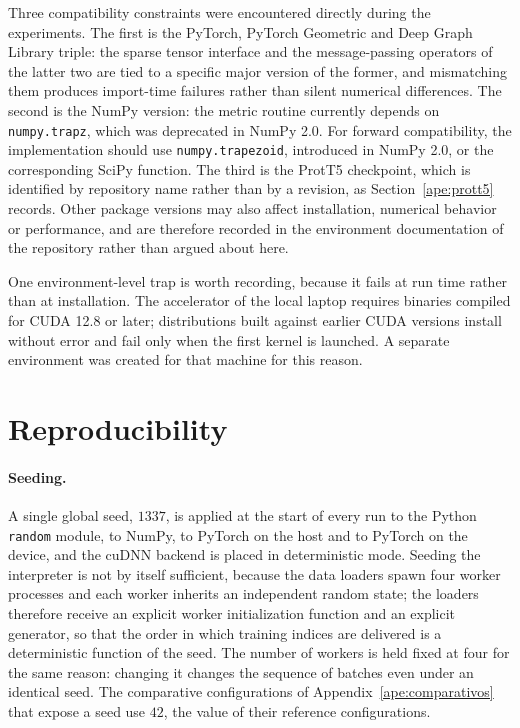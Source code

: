\documentclass[Ingles]{ic-tese-v3}
\begin{document}
\begin{appendices}{}
Three compatibility constraints were encountered directly during the experiments. The first is the
PyTorch, PyTorch Geometric and Deep Graph Library triple: the sparse tensor interface and the
message-passing operators of the latter two are tied to a specific major version of the former, and
mismatching them produces import-time failures rather than silent numerical differences. The second is the NumPy version: the metric routine currently depends on \texttt{numpy.trapz}, which was deprecated in NumPy 2.0. For forward compatibility, the implementation should use \texttt{numpy.trapezoid}, introduced in NumPy 2.0, or the corresponding SciPy function. The third is the
ProtT5 checkpoint, which is identified by repository name rather than by a revision, as
Section~\ref{ape:prott5} records. Other package versions may also affect installation, numerical
behavior or performance, and are therefore recorded in the environment documentation of the
repository rather than argued about here.

One environment-level trap is worth recording, because it fails at run time rather than at
installation. The accelerator of the local laptop requires binaries compiled for CUDA 12.8 or
later; distributions built against earlier CUDA versions install without error and fail only when
the first kernel is launched. A separate environment was created for that machine for this reason.

\section{Reproducibility}
\label{ape:repro}

\paragraph{Seeding.} A single global seed, $1337$, is applied at the start of every run to the
Python \texttt{random} module, to NumPy, to PyTorch on the host and to PyTorch on the device, and the
cuDNN backend is placed in deterministic mode. Seeding the interpreter is not by itself sufficient,
because the data loaders spawn four worker processes and each worker inherits an independent random
state; the loaders therefore receive an explicit worker initialization function and an explicit
generator, so that the order in which training indices are delivered is a deterministic function of
the seed. The number of workers is held fixed at four for the same reason: changing it changes the
sequence of batches even under an identical seed. The comparative configurations of
Appendix~\ref{ape:comparativos} that expose a seed use $42$, the value of their reference
configurations.


\end{appendices}
\end{document}
